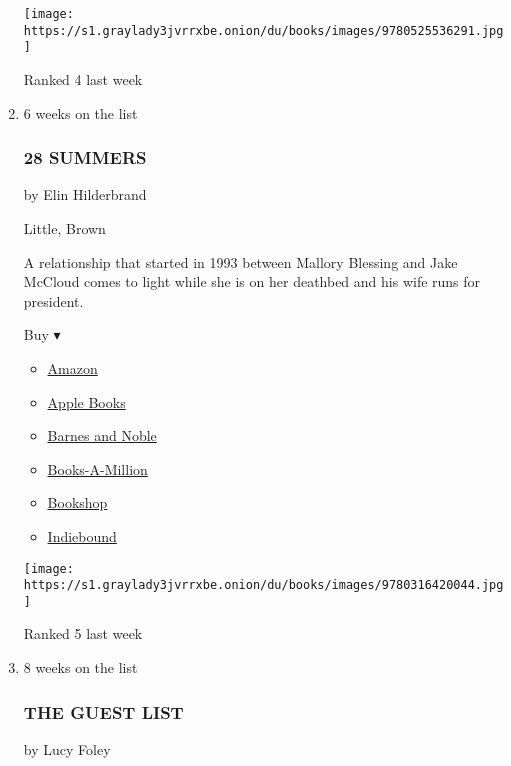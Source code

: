 \begin{enumerate}
  \texttt{[image: https://s1.graylady3jvrrxbe.onion/du/books/images/9780525536291.jpg]}

  Ranked 4 last week
\item
  6 weeks on the list

  \hypertarget{28-summers}{%
  \subsubsection{28 SUMMERS}\label{28-summers}}

  by Elin Hilderbrand

  Little, Brown

  A relationship that started in 1993 between Mallory Blessing and Jake
  McCloud comes to light while she is on her deathbed and his wife runs
  for president.

  Buy ▾

  \begin{itemize}
  \tightlist
  \item
    \href{https://www.amazon.com/dp/0316420042?tag=NYTBSREV-20\&tag=NYTBS-20}{Amazon}
  \item
    \href{https://du-gae-books-dot-nyt-du-prd.appspot.com/buy?title=28+SUMMERS\&author=Elin+Hilderbrand}{Apple
    Books}
  \item
    \href{https://www.anrdoezrs.net/click-7990613-11819508?url=https\%3A\%2F\%2Fwww.barnesandnoble.com\%2Fw\%2F\%3Fean\%3D9780316420044}{Barnes
    and Noble}
  \item
    \href{https://www.anrdoezrs.net/click-7990613-35140?url=https\%3A\%2F\%2Fwww.booksamillion.com\%2Fp\%2F28\%2BSUMMERS\%2FElin\%2BHilderbrand\%2F9780316420044}{Books-A-Million}
  \item
    \href{https://bookshop.org/a/3546/9780316420044}{Bookshop}
  \item
    \href{https://www.indiebound.org/book/9780316420044?aff=NYT}{Indiebound}
  \end{itemize}

  \texttt{[image: https://s1.graylady3jvrrxbe.onion/du/books/images/9780316420044.jpg]}

  Ranked 5 last week
\item
  8 weeks on the list

  \hypertarget{the-guest-list}{%
  \subsubsection{THE GUEST LIST}\label{the-guest-list}}

  by Lucy Foley


\end{enumerate}
